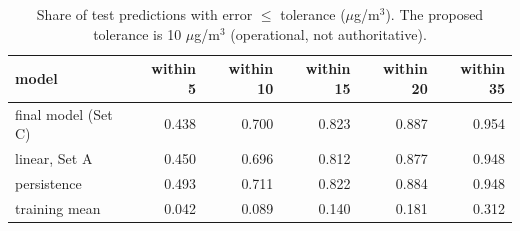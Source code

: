 \begin{table}[t]
\centering
\small
\caption{Share of test predictions with \textbar{}error\textbar{} $\leq$ tolerance ($\mu$g/m$^3$). The proposed tolerance is 10 $\mu$g/m$^3$ (operational, not authoritative).}
\label{tab:table_S12_decision_threshold_sensitivity}
\begin{tabular}{lrrrrr}
\toprule
model & within 5 & within 10 & within 15 & within 20 & within 35 \\
\midrule
final model (Set C) & 0.438 & 0.700 & 0.823 & 0.887 & 0.954 \\
linear, Set A & 0.450 & 0.696 & 0.812 & 0.877 & 0.948 \\
persistence & 0.493 & 0.711 & 0.822 & 0.884 & 0.948 \\
training mean & 0.042 & 0.089 & 0.140 & 0.181 & 0.312 \\
\bottomrule
\end{tabular}
\end{table}
